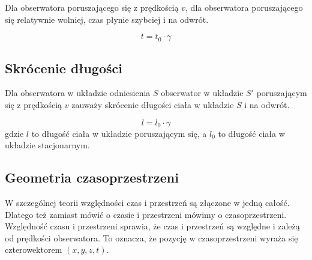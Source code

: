 \documentclass{../notatki}
\begin{document}
Dla obserwatora poruszającego się z prędkością $v$, dla obserwatora
poruszającego
się relatywnie wolniej, czas płynie szybciej i na odwrót.

$$
t = t_0 \cdot \gamma
$$

\subsection{Skrócenie długości}

Dla obserwatora w układzie odniesienia $S$ obserwator w układzie $S'$
poruszającym się z prędkością $v$ zauważy skrócenie długości ciała
w układzie $S$ i na odwrót.

$$
l = l_0 \cdot \gamma
$$
gdzie $l$ to długość ciała w układzie poruszającym się, a $l_0$ to długość
ciała w układzie stacjonarnym.

\subsection{Geometria czasoprzestrzeni}

W szczególnej teorii względności czas i przestrzeń są złączone w jedną
całość. Dlatego też zamiast mówić o czasie i przestrzeni mówimy o
czasoprzestrzeni.
Względność czasu i przestrzeni sprawia, że czas i przestrzeń są względne
i zależą od prędkości obserwatora. To oznacza, że pozycję w czasoprzestrzeni
wyraża się czterowektorem $(x, y, z, t)$.
\end{document}
